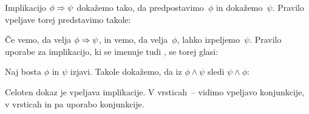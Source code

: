 Implikacijo $\phi \Rightarrow \psi$ dokažemo tako, da predpostavimo~$\phi$ in dokažemo~$\psi$.
Pravilo vpeljave torej predstavimo takole:
%
\begin{boxDisplay}
  \begin{boxedProof}
    \begin{boxFrame}
    \end{boxFrame}
  \end{boxedProof}
\end{boxDisplay}
%
Če vemo, da velja $\phi \Rightarrow \psi$, in vemo, da velja~$\phi$, lahko izpeljemo~$\psi$.
%
Pravilo uporabe za implikacijo, ki se imenuje tudi , se torej glasi:
%
\begin{boxDisplay}
  \begin{boxedProof}[reserved]
    \begin{boxFrame}
      \boxGap
      \boxGap
    \end{boxFrame}
  \end{boxedProof}
\end{boxDisplay}

\begin{zgled}
  Naj bosta $\phi$ in $\psi$ izjavi. Takole dokažemo, da iz $\phi \land \psi$ sledi $\psi \land \phi$:
  \begin{boxDisplay}
  \begin{boxedProof}[numbered]
    \begin{boxFrame}
       \label{box:conj-comm-1}
       \label{box:conj-comm-2}
      \begin{boxNested}[1]
         \label{box:conj-comm-3}
      \end{boxNested}
      \begin{boxNested}[1]
         \label{box:conj-comm-4}
      \end{boxNested}
    \end{boxFrame}
  \end{boxedProof}
  \end{boxDisplay}
  Celoten dokaz je vpeljava implikacije.
  V vrsticah~-- vidimo vpeljavo konjunkcije,
  v vrsticah  in  pa uporabo konjunkcije.
\end{zgled}

